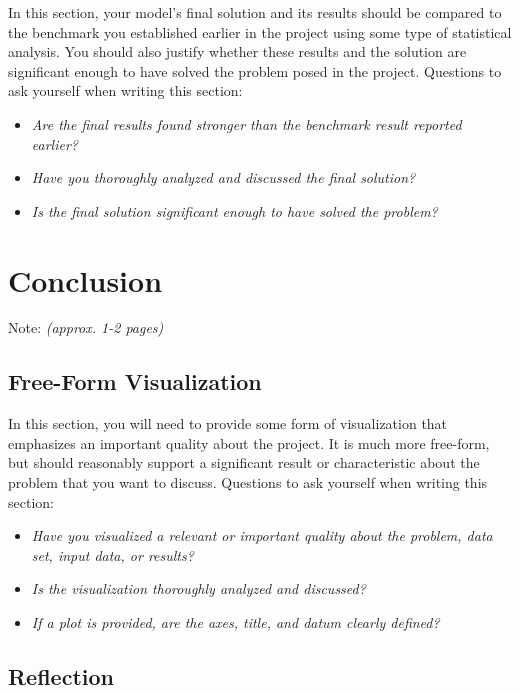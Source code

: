 \documentclass{article}
\begin{document}
In this section, your model's final solution and its results should be
compared to the benchmark you established earlier in the project using
some type of statistical analysis. You should also justify whether these
results and the solution are significant enough to have solved the
problem posed in the project. Questions to ask yourself when writing
this section:

\begin{itemize}
\item
  \emph{Are the final results found stronger than the benchmark result
  reported earlier?}
\item
  \emph{Have you thoroughly analyzed and discussed the final solution?}
\item
  \emph{Is the final solution significant enough to have solved the
  problem?}
\end{itemize}

\section{Conclusion}\label{conclusion}

Note: \emph{(approx. 1-2 pages)}


\subsection{Free-Form Visualization}\label{free-form-visualization}

In this section, you will need to provide some form of visualization
that emphasizes an important quality about the project. It is much more
free-form, but should reasonably support a significant result or
characteristic about the problem that you want to discuss. Questions to
ask yourself when writing this section:

\begin{itemize}
\item
  \emph{Have you visualized a relevant or important quality about the
  problem, data set, input data, or results?}
\item
  \emph{Is the visualization thoroughly analyzed and discussed?}
\item
  \emph{If a plot is provided, are the axes, title, and datum clearly
  defined?}
\end{itemize}

\subsection{Reflection}\label{reflection}
\end{document}
